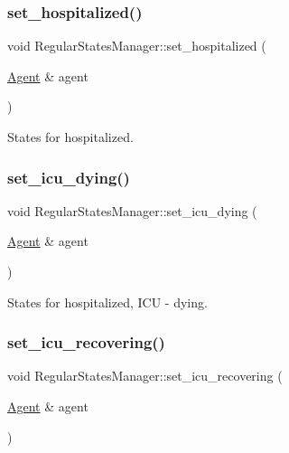 \subsubsection{\texorpdfstring{set\+\_\+hospitalized()}{set\_hospitalized()}}
{\footnotesize\ttfamily void Regular\+States\+Manager\+::set\+\_\+hospitalized (\begin{DoxyParamCaption}\item[{\hyperlink{classAgent}{Agent} \&}]{agent }\end{DoxyParamCaption})}



States for hospitalized. 

\mbox{\label{classRegularStatesManager_af04422e175919ff93d09f19832fc122c}} 
\subsubsection{\texorpdfstring{set\+\_\+icu\+\_\+dying()}{set\_icu\_dying()}}
{\footnotesize\ttfamily void Regular\+States\+Manager\+::set\+\_\+icu\+\_\+dying (\begin{DoxyParamCaption}\item[{\hyperlink{classAgent}{Agent} \&}]{agent }\end{DoxyParamCaption})}



States for hospitalized, I\+CU -\/ dying. 

\mbox{\label{classRegularStatesManager_a34094d08eb2378f7e02d73da4599fab7}} 
\subsubsection{\texorpdfstring{set\+\_\+icu\+\_\+recovering()}{set\_icu\_recovering()}}
{\footnotesize\ttfamily void Regular\+States\+Manager\+::set\+\_\+icu\+\_\+recovering (\begin{DoxyParamCaption}\item[{\hyperlink{classAgent}{Agent} \&}]{agent }\end{DoxyParamCaption})}



